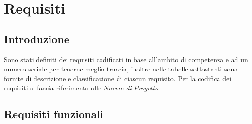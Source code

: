 
\section{Requisiti}
\subsection{Introduzione}
Sono stati definiti dei requisiti codificati in base all’ambito di competenza e ad un numero seriale per
tenerne meglio traccia, inoltre nelle tabelle sottostanti sono fornite di descrizione e classificazione di ciascun
requisito. 
Per la codifica dei requisiti si faccia riferimento alle \textit{Norme di Progetto}
\subsection{Requisiti funzionali}
